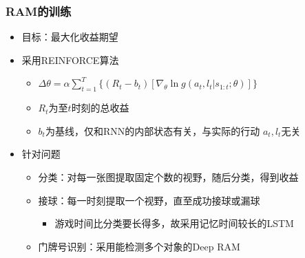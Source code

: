 \documentclass[10pt,CJK]{beamer}
\begin{document}
	\begin{frame}
		\frametitle{RAM的训练}
		\begin{itemize}
			\item 目标：最大化收益期望\pause
			\item 采用REINFORCE算法
			\begin{itemize}
				\item $
				\Delta\theta=\alpha\sum_{t=1}^T\lbrace
				\left(R_t-b_t\right)
				\left[\nabla_{\theta}\ln g\left(a_t,l_t\vert
				s_{1:t};\theta
				\right)\right]\rbrace$
				\item $R_t$为至$t$时刻的总收益
				\item $b_t$为基线，仅和RNN的内部状态有关，与实际的行动
				$a_t,l_t$无关
			\end{itemize}\pause
			\item 针对问题
			\begin{itemize}
				\item 分类：对每一张图提取固定个数的视野，随后分类，得到收益
				\item 接球：每一时刻提取一个视野，直至成功接球或漏球
				\begin{itemize}
					\item 游戏时间比分类要长得多，故采用记忆时间较长的LSTM
				\end{itemize}
				\item 门牌号识别：采用能检测多个对象的Deep RAM
			\end{itemize}
		\end{itemize}
	\end{frame}
	
\end{document}
